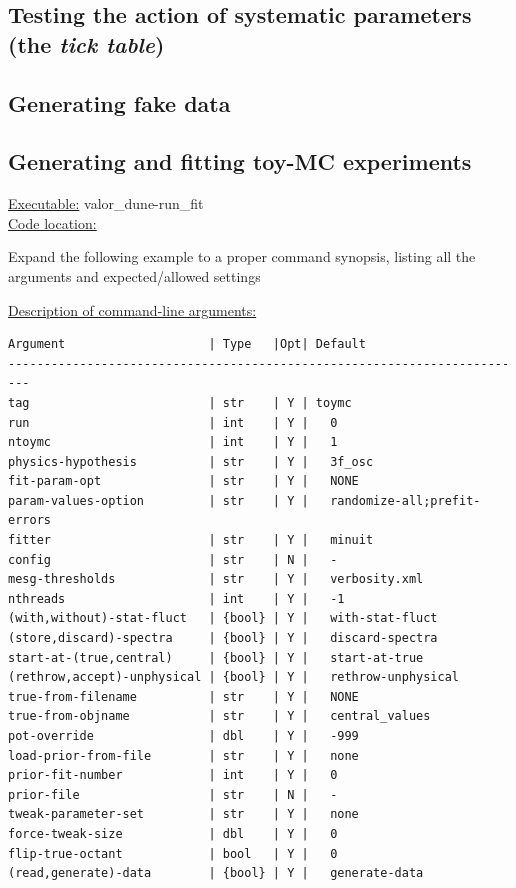 \subsection{
 Testing the action of systematic parameters (the {\it tick table})
}

\subsection{
 Generating fake data
}

\subsection{
 Generating and fitting toy-MC experiments
}


\underline{Executable:} valor\_dune-run\_fit \\

\underline{Code location:} 

{\color{red}Expand the following example to a proper command synopsis, 
listing all the arguments and expected/allowed settings}

\underline{Description of command-line arguments:}


\begin{verbatim}
Argument                    | Type   |Opt| Default
-------------------------------------------------------------------------
tag                         | str    | Y | toymc
run                         | int    | Y |   0
ntoymc                      | int    | Y |   1
physics-hypothesis          | str    | Y |   3f_osc
fit-param-opt               | str    | Y |   NONE
param-values-option         | str    | Y |   randomize-all;prefit-errors
fitter                      | str    | Y |   minuit
config                      | str    | N |   -
mesg-thresholds             | str    | Y |   verbosity.xml
nthreads                    | int    | Y |   -1
(with,without)-stat-fluct   | {bool} | Y |   with-stat-fluct
(store,discard)-spectra     | {bool} | Y |   discard-spectra
start-at-(true,central)     | {bool} | Y |   start-at-true
(rethrow,accept)-unphysical | {bool} | Y |   rethrow-unphysical
true-from-filename          | str    | Y |   NONE 
true-from-objname           | str    | Y |   central_values
pot-override                | dbl    | Y |   -999
load-prior-from-file        | str    | Y |   none
prior-fit-number            | int    | Y |   0
prior-file                  | str    | N |   -
tweak-parameter-set         | str    | Y |   none
force-tweak-size            | dbl    | Y |   0
flip-true-octant            | bool   | Y |   0
(read,generate)-data        | {bool} | Y |   generate-data
\end{verbatim}

